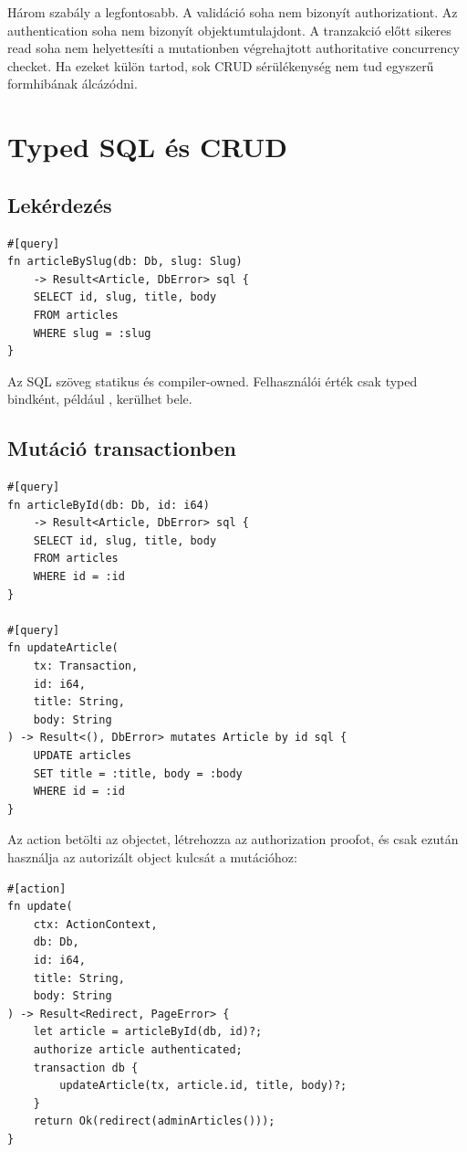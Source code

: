 Három szabály a legfontosabb. A validáció soha nem bizonyít authorizationt. Az authentication soha nem bizonyít objektumtulajdont. A tranzakció előtt sikeres read soha nem helyettesíti a mutationben végrehajtott authoritative concurrency checket. Ha ezeket külön tartod, sok CRUD sérülékenység nem tud egyszerű formhibának álcázódni.

\section{Typed SQL és CRUD}

\subsection*{Lekérdezés}

\begin{lstlisting}[language=Velran]
#[query]
fn articleBySlug(db: Db, slug: Slug)
    -> Result<Article, DbError> sql {
    SELECT id, slug, title, body
    FROM articles
    WHERE slug = :slug
}
\end{lstlisting}

Az SQL szöveg statikus és compiler-owned. Felhasználói érték csak typed bindként, például , kerülhet bele.

\subsection*{Mutáció transactionben}

\begin{lstlisting}[language=Velran]
#[query]
fn articleById(db: Db, id: i64)
    -> Result<Article, DbError> sql {
    SELECT id, slug, title, body
    FROM articles
    WHERE id = :id
}

#[query]
fn updateArticle(
    tx: Transaction,
    id: i64,
    title: String,
    body: String
) -> Result<(), DbError> mutates Article by id sql {
    UPDATE articles
    SET title = :title, body = :body
    WHERE id = :id
}
\end{lstlisting}

Az action betölti az objectet, létrehozza az authorization proofot, és csak ezután használja az autorizált object kulcsát a mutációhoz:

\begin{lstlisting}[language=Velran]
#[action]
fn update(
    ctx: ActionContext,
    db: Db,
    id: i64,
    title: String,
    body: String
) -> Result<Redirect, PageError> {
    let article = articleById(db, id)?;
    authorize article authenticated;
    transaction db {
        updateArticle(tx, article.id, title, body)?;
    }
    return Ok(redirect(adminArticles()));
}
\end{lstlisting}

